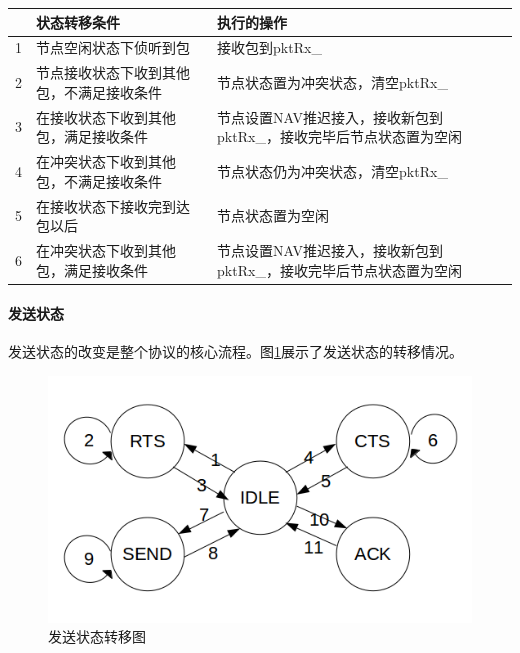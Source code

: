 \begin{table}[!ht]
	\centering
\begin{tabular}{c p{6cm} p{6cm}}
	\hline  %
	 &状态转移条件&执行的操作\\
	\hline  %
	1&节点空闲状态下侦听到包 & 接收包到pktRx\_\\
	2&节点接收状态下收到其他包，不满足接收条件&节点状态置为冲突状态，清空pktRx\_\\
	3&在接收状态下收到其他包，满足接收条件&节点设置NAV推迟接入，接收新包到pktRx\_，接收完毕后节点状态置为空闲\\
	4&在冲突状态下收到其他包，不满足接收条件&节点状态仍为冲突状态，清空pktRx\_\\
	5&在接收状态下接收完到达包以后&节点状态置为空闲\\	
	6&在冲突状态下收到其他包，满足接收条件&节点设置NAV推迟接入，接收新包到pktRx\_，接收完毕后节点状态置为空闲\\
	\hline
\end{tabular}
\end{table}

\paragraph{发送状态} 发送状态的改变是整个协议的核心流程。图\ref{fig7}展示了发送状态的转移情况。
 \begin{figure}[!ht]
 	\centering
 	\includegraphics[scale=0.4]{figures/txstate.png}
 	\caption{
 		发送状态转移图
 	}
 	\label{fig7}
 \end{figure}
 
